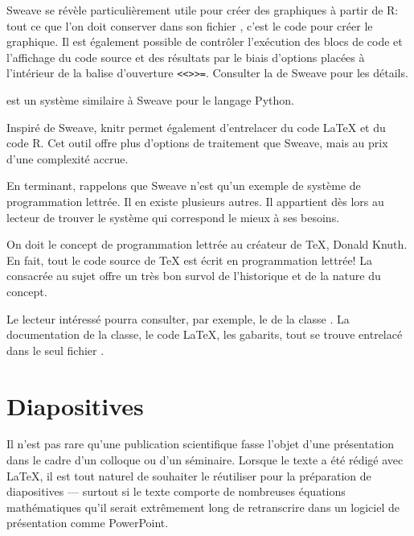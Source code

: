 Sweave se révèle particulièrement utile pour créer des graphiques à
partir de R: tout ce que l'on doit conserver dans son fichier
, c'est le code pour créer le graphique. Il est également
possible de contrôler l'exécution des blocs de code et l'affichage du
code source et des résultats par le biais d'options placées à
l'intérieur de la balise d'ouverture \verb|<<>>=|. Consulter la %
de Sweave pour les détails.

 est un système similaire à
Sweave pour le langage Python.

Inspiré de Sweave, knitr \citep{knitr} permet également d'entrelacer
du code {\LaTeX} et du code R. Cet outil offre plus d'options de
traitement que Sweave, mais au prix d'une complexité accrue.

En terminant, rappelons que Sweave n'est qu'un exemple de système de
programmation lettrée. Il en existe plusieurs autres. Il appartient
dès lors au lecteur de trouver le système qui correspond le mieux à
ses besoins.

\begin{information}
  On doit le concept de programmation lettrée au créateur de {\TeX},
  Donald Knuth.  En fait, tout le code source de {\TeX} est écrit
  en programmation lettrée! La %
  consacrée au sujet offre un très bon survol de l'historique et de la
  nature du concept.

  Le lecteur intéressé pourra consulter, par exemple, le %
  de la classe . La documentation de la classe, le
  code {\LaTeX}, les gabarits, tout se trouve entrelacé
  dans le seul fichier .
\end{information}



\section{Diapositives}
\label{sec:trucs:diapositives}

Il n'est pas rare qu'une publication scientifique fasse l'objet d'une
présentation dans le cadre d'un colloque ou d'un séminaire. Lorsque le
texte a été rédigé avec {\LaTeX}, il est tout naturel de souhaiter le
réutiliser pour la préparation de diapositives --- surtout si le texte
comporte de nombreuses équations mathématiques qu'il serait
extrêmement long de retranscrire dans un logiciel de présentation
comme PowerPoint.

